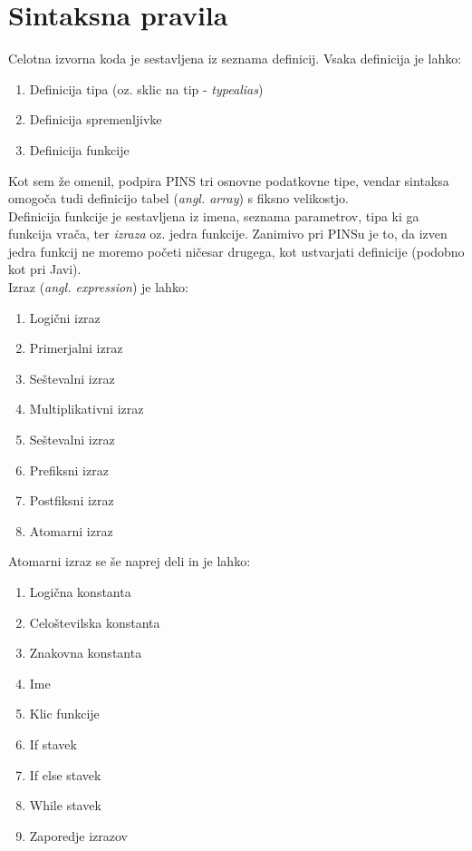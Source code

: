 \documentclass[a4paper, 12p]{book}
\begin{document}
\section{Sintaksna pravila}

Celotna izvorna koda je sestavljena iz seznama definicij. Vsaka definicija je lahko:

\begin{enumerate}
	\item Definicija tipa (oz. sklic na tip - \textit{typealias})
	\item Definicija spremenljivke
	\item Definicija funkcije
\end{enumerate}

Kot sem že omenil, podpira PINS tri osnovne podatkovne tipe, vendar sintaksa omogoča tudi definicijo tabel (\textit{angl. array}) s fiksno velikostjo. \\
\indent Definicija funkcije je sestavljena iz imena, seznama parametrov, tipa ki ga funkcija vrača, ter \textit{izraza} oz. jedra funkcije. Zanimivo pri PINSu je to, da izven jedra funkcij ne moremo početi ničesar drugega, kot ustvarjati definicije (podobno kot pri Javi). \\
\indent Izraz (\textit{angl. expression}) je lahko:
\begin{enumerate}
	\item Logični izraz
	\item Primerjalni izraz
	\item Seštevalni izraz
	\item Multiplikativni izraz
	\item Seštevalni izraz
	\item Prefiksni izraz
	\item Postfiksni izraz
	\item Atomarni izraz
\end{enumerate}

Atomarni izraz se še naprej deli in je lahko:
\begin{enumerate}
	\item Logična konstanta
	\item Celoštevilska konstanta
	\item Znakovna konstanta
	\item Ime
	\item Klic funkcije
	\item If stavek
	\item If else stavek
	\item While stavek
	\item Zaporedje izrazov
\end{enumerate}
\end{document}
